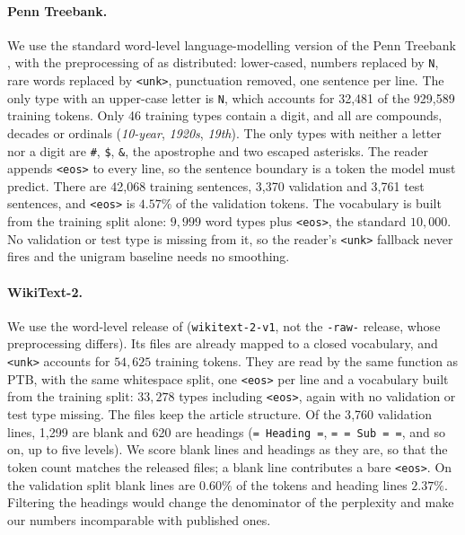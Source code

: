 \paragraph{Penn Treebank.}
We use the standard word-level language-modelling version of the Penn Treebank
\citep{marcus1993building}, with the preprocessing of \citet{mikolov2012statistical} as
distributed: lower-cased, numbers replaced by \texttt{N}, rare
words replaced by \texttt{<unk>}, punctuation removed, one sentence per line. The only type with
an upper-case
letter is \texttt{N}, which accounts for 32{,}481 of the 929{,}589 training tokens. Only 46
training types contain a digit, and all are compounds, decades or ordinals (\textit{10-year},
\textit{1920s}, \textit{19th}). The only types with neither a letter nor a digit are
\texttt{\#}, \texttt{\$}, \texttt{\&}, the apostrophe and two escaped asterisks. The reader
appends \texttt{<eos>} to every line, so the sentence boundary is a token the model must
predict. There are 42{,}068 training sentences, 3{,}370 validation and 3{,}761 test sentences,
and \texttt{<eos>} is $4.57\%$ of the validation tokens. The vocabulary is built from the
training split alone: $9{,}999$ word types plus \texttt{<eos>}, the standard $10{,}000$. No
validation or test type is missing from it, so the reader's \texttt{<unk>} fallback never fires
and the unigram baseline needs no smoothing.

\paragraph{WikiText-2.}
We use the word-level release of \citet{merity2017pointer} (\texttt{wikitext-2-v1}, not the
\texttt{-raw-} release, whose preprocessing differs). Its files are already mapped to a closed
vocabulary, and \texttt{<unk>} accounts for $54{,}625$ training tokens. They are read by the same
function as PTB, with the same whitespace split, one \texttt{<eos>} per line and a vocabulary
built from the training split: $33{,}278$ types including \texttt{<eos>}, again with no
validation or test type missing. The files keep the article structure. Of the 3{,}760
validation lines, 1{,}299 are blank and 620 are headings (\texttt{= Heading =},
\texttt{= = Sub = =}, and so on, up to five levels). We score blank lines and headings as they
are, so that the token count matches the released files; a blank line contributes a bare
\texttt{<eos>}. On the validation split blank lines are $0.60\%$ of the tokens and heading lines
$2.37\%$. Filtering the headings would change the denominator of the perplexity and make our
numbers incomparable with published ones.

